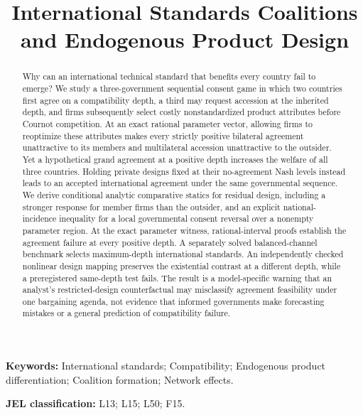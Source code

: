 \documentclass[11pt,a4paper]{article}
\title{International Standards Coalitions and Endogenous Product Design}
\author{}
\date{}
\begin{document}
\maketitle

\begin{abstract}
Why can an international technical standard that benefits every country fail
to emerge? We study a three-government sequential consent game in which two
countries first agree on a compatibility depth, a third may request accession
at the inherited depth, and firms subsequently select costly nonstandardized
product attributes before Cournot competition. At an exact rational parameter
vector, allowing firms to reoptimize these attributes makes every strictly
positive bilateral agreement unattractive to its members and multilateral
accession unattractive to the outsider. Yet a hypothetical grand agreement
at a positive depth increases the welfare of all three countries. Holding
private designs fixed at their no-agreement Nash levels instead leads to an
accepted international agreement under the same governmental sequence.
We derive conditional analytic comparative statics for residual design,
including a stronger response for member firms than the outsider, and an
explicit national-incidence inequality for a local governmental consent
reversal over a nonempty parameter region. At the exact parameter witness,
rational-interval proofs establish the agreement failure at every positive
depth. A separately solved balanced-channel benchmark selects maximum-depth
international standards. An independently checked nonlinear design mapping preserves the
existential contrast at a different depth, while a preregistered same-depth
test fails. The result is a model-specific warning that an analyst's
restricted-design counterfactual may misclassify agreement feasibility
under one bargaining agenda, not evidence that informed governments
make forecasting mistakes or a general prediction of compatibility failure.
\end{abstract}
\noindent\textbf{Keywords:} International standards; Compatibility;
Endogenous product differentiation; Coalition formation; Network effects.
\par\smallskip
\noindent\textbf{JEL classification:} L13; L15; L50; F15.











\appendix





\end{document}
